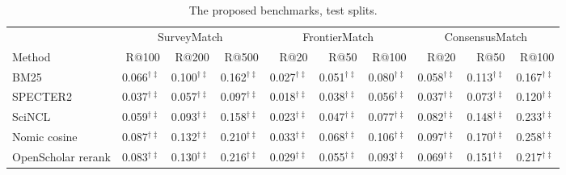 \begin{table}[t]
\centering
\footnotesize
\setlength{\tabcolsep}{4pt}
\begin{subtable}{\textwidth}
\centering
\caption{The proposed benchmarks, test splits.}
\label{tab:proposed}
\begin{tabular}{lrrrrrrrrr}
\toprule
 & \multicolumn{3}{c}{SurveyMatch} & \multicolumn{3}{c}{FrontierMatch} & \multicolumn{3}{c}{ConsensusMatch} \\
\cmidrule(lr){2-4}\cmidrule(lr){5-7}\cmidrule(lr){8-10}
Method & R@100 & R@200 & R@500 & R@20 & R@50 & R@100 & R@20 & R@50 & R@100 \\
\midrule
BM25 & 0.066$^{\dagger\ddagger}$ & 0.100$^{\dagger\ddagger}$ & 0.162$^{\dagger\ddagger}$ & 0.027$^{\dagger\ddagger}$ & 0.051$^{\dagger\ddagger}$ & 0.080$^{\dagger\ddagger}$ & 0.058$^{\dagger\ddagger}$ & 0.113$^{\dagger\ddagger}$ & 0.167$^{\dagger\ddagger}$ \\
SPECTER2 & 0.037$^{\dagger\ddagger}$ & 0.057$^{\dagger\ddagger}$ & 0.097$^{\dagger\ddagger}$ & 0.018$^{\dagger\ddagger}$ & 0.038$^{\dagger\ddagger}$ & 0.056$^{\dagger\ddagger}$ & 0.037$^{\dagger\ddagger}$ & 0.073$^{\dagger\ddagger}$ & 0.120$^{\dagger\ddagger}$ \\
SciNCL & 0.059$^{\dagger\ddagger}$ & 0.093$^{\dagger\ddagger}$ & 0.158$^{\dagger\ddagger}$ & 0.023$^{\dagger\ddagger}$ & 0.047$^{\dagger\ddagger}$ & 0.077$^{\dagger\ddagger}$ & 0.082$^{\dagger\ddagger}$ & 0.148$^{\dagger\ddagger}$ & 0.233$^{\dagger\ddagger}$ \\
Nomic cosine & 0.087$^{\dagger\ddagger}$ & 0.132$^{\dagger\ddagger}$ & 0.210$^{\dagger\ddagger}$ & 0.033$^{\dagger\ddagger}$ & 0.068$^{\dagger\ddagger}$ & 0.106$^{\dagger\ddagger}$ & 0.097$^{\dagger\ddagger}$ & 0.170$^{\dagger\ddagger}$ & 0.258$^{\dagger\ddagger}$ \\
OpenScholar rerank & 0.083$^{\dagger\ddagger}$ & 0.130$^{\dagger\ddagger}$ & 0.216$^{\dagger\ddagger}$ & 0.029$^{\dagger\ddagger}$ & 0.055$^{\dagger\ddagger}$ & 0.093$^{\dagger\ddagger}$ & 0.069$^{\dagger\ddagger}$ & 0.151$^{\dagger\ddagger}$ & 0.217$^{\dagger\ddagger}$ \\

\end{tabular}
\end{subtable}
\end{table}
